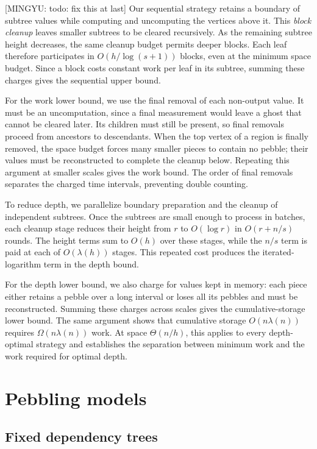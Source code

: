 \documentclass[11pt]{article}
\theoremstyle{definition}
\theoremstyle{remark}
\newcommand{\mingyu}[1]{{\color{magenta}\footnotesize [MINGYU: #1]}} %
\begin{document}
\mingyu{todo: fix this at last}
Our sequential strategy retains a boundary of subtree values while computing and uncomputing the vertices above it. This \emph{block cleanup} leaves smaller subtrees to be cleared recursively. As the remaining subtree height decreases, the same cleanup budget permits deeper blocks. Each leaf therefore participates in $O(h/\log(s+1))$ blocks, even at the minimum space budget. Since a block costs constant work per leaf in its subtree, summing these charges gives the sequential upper bound.

For the work lower bound, we use the final removal of each non-output value. It must be an uncomputation, since a final measurement would leave a ghost that cannot be cleared later. Its children must still be present, so final removals proceed from ancestors to descendants. When the top vertex of a region is finally removed, the space budget forces many smaller pieces to contain no pebble; their values must be reconstructed to complete the cleanup below. Repeating this argument at smaller scales gives the work bound. The order of final removals separates the charged time intervals, preventing double counting.

To reduce depth, we parallelize boundary preparation and the cleanup of independent subtrees. Once the subtrees are small enough to process in batches, each cleanup stage reduces their height from $r$ to $O(\log r)$ in $O(r+n/s)$ rounds. The height terms sum to $O(h)$ over these stages, while the $n/s$ term is paid at each of $O(\lambda(h))$ stages. This repeated cost produces the iterated-logarithm term in the depth bound.

For the depth lower bound, we also charge for values kept in memory: each piece either retains a pebble over a long interval or loses all its pebbles and must be reconstructed. Summing these charges across scales gives the cumulative-storage lower bound. The same argument shows that cumulative storage $O(n\lambda(n))$ requires $\Omega(n\lambda(n))$ work. At space $\Theta(n/h)$, this applies to every depth-optimal strategy and establishes the separation between minimum work and the work required for optimal depth.

\section{Pebbling models}
\label{sec:models}

\subsection{Fixed dependency trees}
\end{document}

